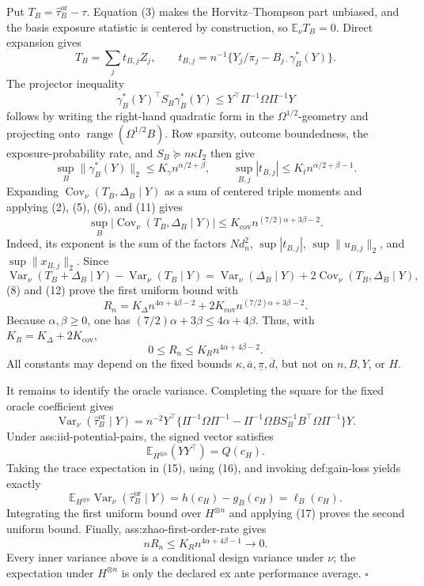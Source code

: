 Put \(T_B=\widehat\tau_B^{\mathrm{or}}-\tau\).  Equation (3) makes the Horvitz--Thompson part unbiased, and the basis exposure statistic is centered by construction, so \(\mathbb E_\nu T_B=0\).  Direct expansion gives
\[
T_B=\sum_jt_{B,j}Z_j,
\qquad
t_{B,j}=n^{-1}\{Y_j/\pi_j-B_{j\cdot}\gamma_B^*(Y)\}.
\tag{9}
\]
The projector inequality
\[
\gamma_B^*(Y)^\top S_B\gamma_B^*(Y)
\le Y^\top\Pi^{-1}\Omega\Pi^{-1}Y
\tag{10}
\]
follows by writing the right-hand quadratic form in the \(\Omega^{1/2}\)-geometry and projecting onto \(\operatorname{range}(\Omega^{1/2}B)\).  Row sparsity, outcome boundedness, the exposure-probability rate, and \(S_B\succeq n\kappa I_2\) then give
\[
\sup_B\lVert\gamma_B^*(Y)\rVert_2\le K_\gamma n^{\alpha/2+\beta},
\qquad
\sup_{B,j}|t_{B,j}|\le K_tn^{\alpha/2+\beta-1}.
\tag{11}
\]
Expanding \(\operatorname{Cov}_\nu(T_B,\Delta_B\mid Y)\) as a sum of centered triple moments and applying (2), (5), (6), and (11) gives
\[
\sup_B|\operatorname{Cov}_\nu(T_B,\Delta_B\mid Y)|
\le K_{\mathrm{cov}}n^{(7/2)\alpha+3\beta-2}.
\tag{12}
\]
Indeed, its exponent is the sum of the factors \(N d_n^2\), \(\sup|t_{B,j}|\), \(\sup\lVert u_{B,j}\rVert_2\), and \(\sup\lVert x_{B,j}\rVert_2\).  Since
\[
\operatorname{Var}_\nu(T_B+\Delta_B\mid Y)-\operatorname{Var}_\nu(T_B\mid Y)
=\operatorname{Var}_\nu(\Delta_B\mid Y)+2\operatorname{Cov}_\nu(T_B,\Delta_B\mid Y),
\]
(8) and (12) prove the first uniform bound with
\[
R_n=K_\Delta n^{4\alpha+4\beta-2}
+2K_{\mathrm{cov}}n^{(7/2)\alpha+3\beta-2}.
\tag{13}
\]
Because \(\alpha,\beta\ge0\), one has \((7/2)\alpha+3\beta\le4\alpha+4\beta\).  Thus, with \(K_R=K_\Delta+2K_{\mathrm{cov}}\),
\[
0\le R_n\le K_Rn^{4\alpha+4\beta-2}.
\tag{14}
\]
All constants may depend on the fixed bounds \(\kappa,\overline a,\underline\pi,\overline d\), but not on \(n,B,Y\), or \(H\).

It remains to identify the oracle variance.  Completing the square for the fixed oracle coefficient gives
\[
\operatorname{Var}_\nu(\widehat\tau_B^{\mathrm{or}}\mid Y)
=n^{-2}Y^\top\{\Pi^{-1}\Omega\Pi^{-1}
-\Pi^{-1}\Omega BS_B^{-1}B^\top\Omega\Pi^{-1}\}Y.
\tag{15}
\]
Under ass:iid-potential-pairs, the signed vector satisfies
\[
\mathbb E_{H^{\otimes n}}(YY^\top)=Q(c_H).
\tag{16}
\]
Taking the trace expectation in (15), using (16), and invoking def:gain-loss yields exactly
\[
\mathbb E_{H^{\otimes n}}
\operatorname{Var}_\nu(\widehat\tau_B^{\mathrm{or}}\mid Y)
=h(c_H)-g_B(c_H)=\ell_B(c_H).
\tag{17}
\]
Integrating the first uniform bound over \(H^{\otimes n}\) and applying (17) proves the second uniform bound.  Finally, ass:zhao-first-order-rate gives
\[
nR_n\le K_Rn^{4\alpha+4\beta-1}\longrightarrow0.
\]
Every inner variance above is a conditional design variance under \(\nu\); the expectation under \(H^{\otimes n}\) is only the declared ex ante performance average. \(\square\)
